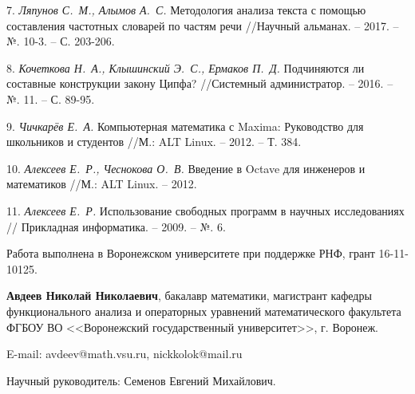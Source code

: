 \documentclass[draft, 12pt]{article}
\begin{document}
7.  \emph{Ляпунов С.~М., Алымов А.~С.}  Методология анализа текста с помощью составления частотных словарей по частям речи //Научный альманах. – 2017. – №. 10-3. – С. 203-206.

8.	\emph{Кочеткова Н.~А., Клышинский Э.~С., Ермаков П.~Д.} Подчиняются ли составные конструкции закону Ципфа? //Системный администратор. – 2016. – №. 11. – С. 89-95.

9.  \emph{Чичкарёв Е.~А.} Компьютерная математика с Maxima: Руководство для школьников и студентов //М.: ALT Linux. – 2012. – Т. 384.

10. \emph{Алексеев Е.~Р., Чеснокова О.~В.} Введение в Octave для инженеров и математиков //М.: ALT Linux. – 2012.

11. \emph{Алексеев Е.~Р.} Использование свободных программ в научных исследованиях // Прикладная информатика. – 2009. – №. 6.



{\small Работа выполнена в Воронежском университете при поддержке РНФ, грант 16-11-10125.}


{\bf Авдеев Николай Николаевич},
бакалавр математики, магистрант кафедры функционального анализа и операторных уравнений математического факультета
ФГБОУ ВО <<Воронежский государственный университет>>, г. Воронеж.

E-mail: avdeev@math.vsu.ru, nickkolok@mail.ru

Научный руководитель: Семенов Евгений Михайлович.
\end{document}
